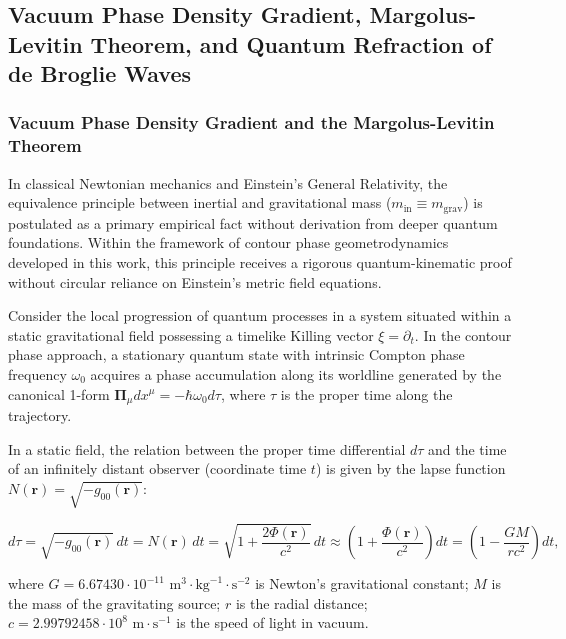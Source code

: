 \documentclass[11pt,a4paper]{article}
\theoremstyle{definition}
\begin{document}
\subsection{Vacuum Phase Density Gradient, Margolus-Levitin Theorem, and Quantum Refraction of de Broglie Waves}\label{sec:2.4}

\subsubsection{Vacuum Phase Density Gradient and the Margolus-Levitin Theorem \cite{ref16}}\label{sec:2.4.1}

In classical Newtonian mechanics and Einstein's General Relativity, the equivalence principle between inertial and gravitational mass ($m_{\text{in}} \equiv m_{\text{grav}}$) is postulated as a primary empirical fact without derivation from deeper quantum foundations. Within the framework of contour phase geometrodynamics developed in this work, this principle receives a rigorous quantum-kinematic proof without circular reliance on Einstein's metric field equations.

Consider the local progression of quantum processes in a system situated within a static gravitational field possessing a timelike Killing vector $\xi = \partial_t$. In the contour phase approach, a stationary quantum state with intrinsic Compton phase frequency $\omega_0$ acquires a phase accumulation along its worldline generated by the canonical 1-form $\mathbf{\Pi}_\mu dx^\mu = -\hbar \omega_0 d\tau$, where $\tau$ is the proper time along the trajectory.

In a static field, the relation between the proper time differential $d\tau$ and the time of an infinitely distant observer (coordinate time $t$) is given by the lapse function $N(\mathbf{r}) = \sqrt{-g_{00}(\mathbf{r})}$:

\begin{equation}\label{eq:2.26}\tag{2.26}
d\tau = \sqrt{-g_{00}(\mathbf{r})} \, dt = N(\mathbf{r}) \, dt = \sqrt{1 + \frac{2\Phi(\mathbf{r})}{c^2}} \, dt \approx \left( 1 + \frac{\Phi(\mathbf{r})}{c^2} \right) dt = \left( 1 - \frac{GM}{r c^2} \right) dt,
\end{equation}

where $G = 6.67430 \cdot 10^{-11}\text{ m}^3\cdot\text{kg}^{-1}\cdot\text{s}^{-2}$ is Newton's gravitational constant;  
$M$ is the mass of the gravitating source;  
$r$ is the radial distance;  
$c = 2.99792458 \cdot 10^8\text{ m}\cdot\text{s}^{-1}$ is the speed of light in vacuum.
\end{document}
